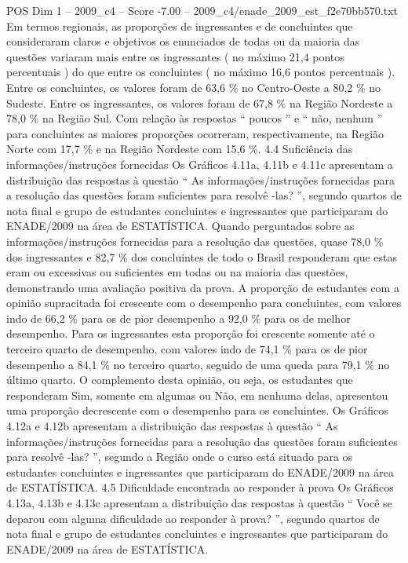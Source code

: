 \begin{textsample}{POS Dim 1 – 2009\_c4 – Score -7.00 – 2009\_c4/enade\_2009\_est\_f2e70bb570.txt}
Em termos regionais, as proporções de ingressantes e de concluintes que consideraram claros e objetivos os enunciados de todas ou da maioria das questões variaram mais entre os ingressantes ( no máximo 21,4 pontos percentuais ) do que entre os concluintes ( no máximo 16,6 pontos percentuais ).
Entre os concluintes, os valores foram de 63,6 \% no Centro-Oeste a 80,2 \% no Sudeste.
Entre os ingressantes, os valores foram de 67,8 \% na Região Nordeste a 78,0 \% na Região Sul.
Com relação às respostas “ poucos ” e “ não, nenhum ” para concluintes as maiores proporções ocorreram, respectivamente, na Região Norte com 17,7 \% e na Região Nordeste com 15,6 \%. 4.4 Suficiência das informações/instruções fornecidas Os Gráficos 4.11a, 4.11b e 4.11c apresentam a distribuição das respostas à questão “ As informações/instruções fornecidas para a resolução das questões foram suficientes para resolvê -las? ”, segundo quartos de nota final e grupo de estudantes concluintes e ingressantes que participaram do ENADE/2009 na área de ESTATÍSTICA.
Quando perguntados sobre as informações/instruções fornecidas para a resolução das questões, quase 78,0 \% dos ingressantes e 82,7 \% dos concluintes de todo o Brasil responderam que estas eram ou excessivas ou suficientes em todas ou na maioria das questões, demonstrando uma avaliação positiva da prova.
A proporção de estudantes com a opinião supracitada foi crescente com o desempenho para concluintes, com valores indo de 66,2 \% para os de pior desempenho a 92,0 \% para os de melhor desempenho.
Para os ingressantes esta proporção foi crescente somente até o terceiro quarto de desempenho, com valores indo de 74,1 \% para os de pior desempenho a 84,1 \% no terceiro quarto, seguido de uma queda para 79,1 \% no último quarto.
O complemento desta opinião, ou seja, os estudantes que responderam Sim, somente em algumas ou Não, em nenhuma delas, apresentou uma proporção decrescente com o desempenho para os concluintes.
Os Gráficos 4.12a e 4.12b apresentam a distribuição das respostas à questão “ As informações/instruções fornecidas para a resolução das questões foram suficientes para resolvê -las? ”, segundo a Região onde o curso está situado para os estudantes concluintes e ingressantes que participaram do ENADE/2009 na área de ESTATÍSTICA. 4.5 Dificuldade encontrada ao responder à prova Os Gráficos 4.13a, 4.13b e 4.13c apresentam a distribuição das respostas à questão “ Você se deparou com alguma dificuldade ao responder à prova? ”, segundo quartos de nota final e grupo de estudantes concluintes e ingressantes que participaram do ENADE/2009 na área de ESTATÍSTICA.

\end{textsample}
